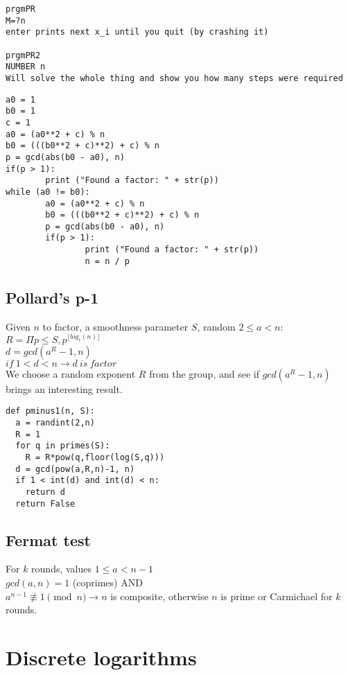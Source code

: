 \documentclass{article}
\begin{document}
\begin{verbatim}
prgmPR
M=?n
enter prints next x_i until you quit (by crashing it)

prgmPR2
NUMBER n
Will solve the whole thing and show you how many steps were required
\end{verbatim}

\begin{verbatim}
a0 = 1
b0 = 1
c = 1
a0 = (a0**2 + c) % n
b0 = (((b0**2 + c)**2) + c) % n
p = gcd(abs(b0 - a0), n)
if(p > 1):
        print ("Found a factor: " + str(p))
while (a0 != b0):
        a0 = (a0**2 + c) % n
        b0 = (((b0**2 + c)**2) + c) % n
        p = gcd(abs(b0 - a0), n)
        if(p > 1):
                print ("Found a factor: " + str(p))
                n = n / p
\end{verbatim}

\subsection{Pollard's p-1}
Given $n$ to factor, a smoothness parameter $S$, random $2 \leq a < n$: \\
$R = \Pi p \leq S, p^{\lfloor log_r(n) \rfloor}$ \\
$d = gcd(a^R-1, n)$ \\
$if~1 < d < n \rightarrow d~is~factor$ \\

We choose a random exponent $R$ from the group, and see if $gcd(a^R -1, n)$
brings an interesting result.

\begin{verbatim}
def pminus1(n, S):
  a = randint(2,n)
  R = 1
  for q in primes(S):
    R = R*pow(q,floor(log(S,q)))
  d = gcd(pow(a,R,n)-1, n)
  if 1 < int(d) and int(d) < n:
    return d
  return False
\end{verbatim}

\subsection{Fermat test}
For $k$ rounds, values $1 \leq a < n-1$ \\
$gcd(a,n) = 1$ (coprimes) AND \\
$a^{n-1} \not\equiv 1 \pmod n \rightarrow n$ is composite,
otherwise $n$ is prime or Carmichael for $k$ rounds. \\

\section{Discrete logarithms}
\end{document}
